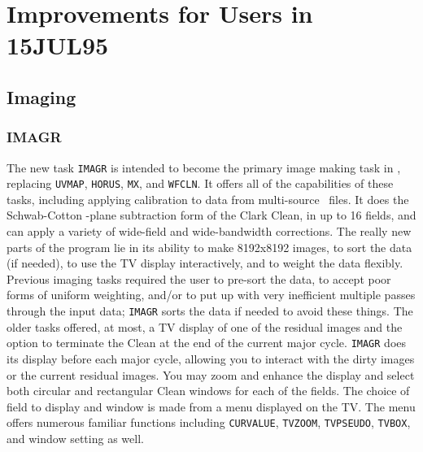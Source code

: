 \section{Improvements for Users in 15JUL95}

\subsection{Imaging}

\subsubsection{IMAGR}

The new task {\tt IMAGR} is intended to become the primary image
making task in \AIPS, replacing {\tt UVMAP}, {\tt HORUS}, {\tt MX},
and \hbox{{\tt WFCLN}}.  It offers all of the capabilities of these
tasks, including applying calibration to data from multi-source \uv\
files.  It does the Schwab-Cotton \uv-plane subtraction form of the
Clark Clean, in up to 16 fields, and can apply a variety of wide-field
and wide-bandwidth corrections.  The really new parts of the program
lie in its ability to make 8192x8192 images, to sort the data (if
needed), to use the TV display interactively, and to weight the data
flexibly.  Previous imaging tasks required the user to pre-sort the
data, to accept poor forms of uniform weighting, and/or to put up with
very inefficient multiple passes through the input data; {\tt IMAGR}
sorts the data if needed to avoid these things.  The older tasks
offered, at most, a TV display of one of the residual images and the
option to terminate the Clean at the end of the current major cycle.
{\tt IMAGR} does its display before each major cycle, allowing you to
interact with the dirty images or the current residual images.  You
may zoom and enhance the display and select both circular and
rectangular Clean windows for each of the fields.  The choice of field
to display and window is made from a menu displayed on the \hbox{TV}.
The menu offers numerous familiar functions including {\tt CURVALUE},
{\tt TVZOOM}, {\tt TVPSEUDO}, {\tt TVBOX}, and window setting as
well.

